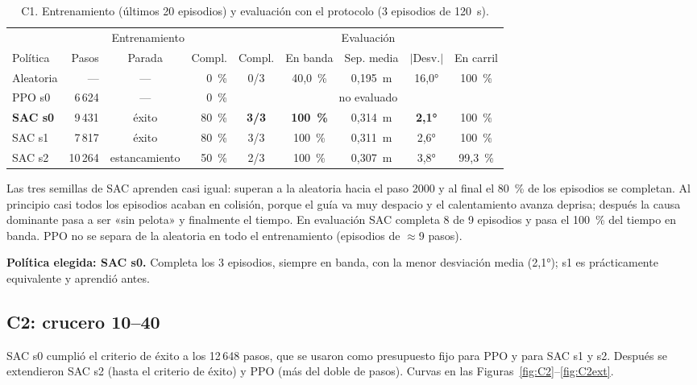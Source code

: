\documentclass[11pt,a4paper]{article}
\begin{document}
\begin{table}[h]
\centering\small
\caption{C1. Entrenamiento (últimos 20 episodios) y evaluación con el protocolo (3 episodios de 120~s).}
\label{tab:C1}
\setlength{\tabcolsep}{3.5pt}
\begin{tabular}{@{}lrcrccccc@{}}
\toprule
& \multicolumn{3}{c}{Entrenamiento} & \multicolumn{5}{c}{Evaluación} \\
\cmidrule(lr){2-4}\cmidrule(l){5-9}
Política & Pasos & Parada & Compl. & Compl. & En banda & Sep. media & $|$Desv.$|$ & En carril \\
\midrule
Aleatoria & --- & --- & 0~\% & 0/3 & 40,0~\% & 0,195~m & 16,0° & 100~\% \\
PPO s0 & 6\,624 & --- & 0~\% & \multicolumn{5}{c}{no evaluado} \\
\textbf{SAC s0} & 9\,431 & éxito & 80~\% & \textbf{3/3} & \textbf{100~\%} & 0,314~m & \textbf{2,1°} & 100~\% \\
SAC s1 & 7\,817 & éxito & 80~\% & 3/3 & 100~\% & 0,311~m & 2,6° & 100~\% \\
SAC s2 & 10\,264 & estancamiento & 50~\% & 2/3 & 100~\% & 0,307~m & 3,8° & 99,3~\% \\
\bottomrule
\end{tabular}
\end{table}

Las tres semillas de SAC aprenden casi igual: superan a la aleatoria hacia el paso 2000 y al final el 80~\% de
los episodios se completan. Al principio casi todos los episodios acaban en colisión, porque el guía va muy
despacio y el calentamiento avanza deprisa; después la causa dominante pasa a ser «sin pelota» y finalmente el
tiempo. En evaluación SAC completa 8 de 9 episodios y pasa el 100~\% del tiempo en banda. PPO no se separa de la
aleatoria en todo el entrenamiento (episodios de $\approx$9 pasos).

\textbf{Política elegida: SAC s0.} Completa los 3 episodios, siempre en banda, con la menor desviación media
(2,1°); s1 es prácticamente equivalente y aprendió antes.

\subsection{C2: crucero 10--40}
SAC s0 cumplió el criterio de éxito a los 12\,648 pasos, que se usaron como presupuesto fijo para PPO y para SAC
s1 y s2. Después se extendieron SAC s2 (hasta el criterio de éxito) y PPO (más del doble de pasos). Curvas en
las Figuras~\ref{fig:C2}--\ref{fig:C2ext}.
\end{document}
